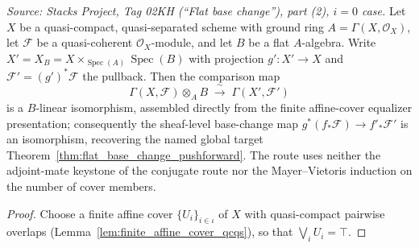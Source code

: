 \begin{theorem}
  \label{thm:fbcb_global_direct}
  \textit{Source: Stacks Project, Tag 02KH (``Flat base change''), part (2), \(i = 0\) case.}
  Let \(X\) be a quasi-compact, quasi-separated scheme with ground ring
  \(A = \Gamma(X,\mathcal{O}_X)\), let \(\mathcal{F}\) be a quasi-coherent \(\mathcal{O}_X\)-module, and
  let \(B\) be a flat \(A\)-algebra. Write \(X' = X_B = X \times_{\operatorname{Spec}(A)}
  \operatorname{Spec}(B)\) with projection \(g' : X' \to X\) and \(\mathcal{F}' = (g')^*\mathcal{F}\) the
  pullback. Then the comparison map
  \[
    \Gamma(X,\mathcal{F}) \otimes_A B \;\xrightarrow{\;\sim\;}\; \Gamma(X', \mathcal{F}')
  \]
  is a \(B\)-linear isomorphism, assembled directly from the finite affine-cover equalizer presentation;
  consequently the sheaf-level base-change map \(g^*(f_*\mathcal{F}) \to f'_*\mathcal{F}'\) is an
  isomorphism, recovering the named global target Theorem~\ref{thm:flat_base_change_pushforward}. The
  route uses neither the adjoint-mate keystone of the conjugate route nor the Mayer--Vietoris induction
  on the number of cover members.

  \begin{proof}
    Choose a finite affine cover \(\{U_i\}_{i\in\iota}\) of \(X\) with quasi-compact pairwise overlaps
    (Lemma~\ref{lem:finite_affine_cover_qcqs}), so that \(\bigvee_i U_i = \top\).


\end{proof}
\end{theorem}
